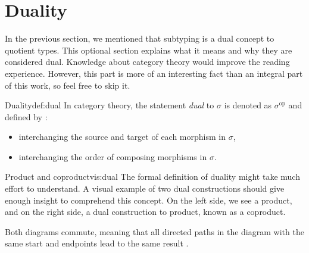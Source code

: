 \section{Duality}
In the previous section, we mentioned that subtyping is a dual concept to quotient types. This optional section explains what it means and why they are considered dual. Knowledge about category theory would improve the reading experience. However, this part is more of an interesting fact than an integral part of this work, so feel free to skip it.
\begin{defi}[]{Duality}{def:dual}
In category theory, the statement \emph{dual} to $\sigma$ is denoted as $\sigma^{\textrm{op}}$ and defined by \cite{CategoryTheory}:
\begin{itemize}
    \itemsep 0em 
    \item interchanging the source and target of each morphism in $\sigma$,
    \item interchanging the order of composing morphisms in $\sigma$.
\end{itemize}
\end{defi}
\pagebreak
\begin{vis}[]{Product and coproduct}{vis:dual}
The formal definition of duality might take much effort to understand. A visual example of two dual constructions should give enough insight to comprehend this concept. On the left side, we see a product, and on the right side, a dual construction to product, known as a coproduct.
\begin{center}
\end{center}
Both diagrams commute, meaning that all directed paths in the diagram with the same start and endpoints lead to the same result \cite{CategoryTheory}.
\end{vis}
